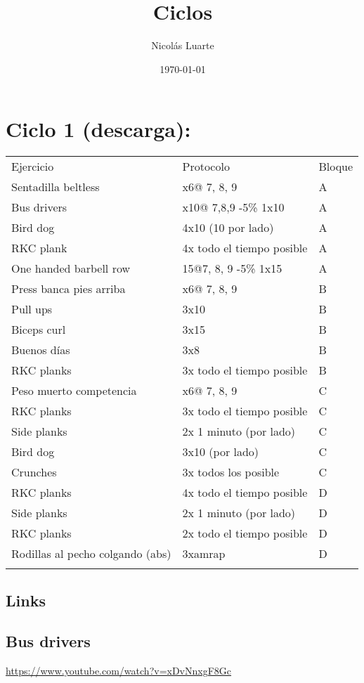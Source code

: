 \documentclass[11pt]{article}
\author{Nicolás Luarte}
\date{\today}
\title{Ciclos}
\begin{document}
\maketitle
\tableofcontents

\section{Ciclo 1 (descarga):}
\label{sec:orgdcea2d1}
\begin{center}
\begin{tabular}{lll}
Ejercicio & Protocolo & Bloque\\
Sentadilla beltless & x6@ 7, 8, 9 & A\\
Bus drivers & x10@ 7,8,9 -5\% 1x10 & A\\
Bird dog & 4x10 (10 por lado) & A\\
RKC plank & 4x todo el tiempo posible & A\\
One handed barbell row & 15@7, 8, 9 -5\% 1x15 & A\\
\hline
Press banca pies arriba & x6@ 7, 8, 9 & B\\
Pull ups & 3x10 & B\\
Biceps curl & 3x15 & B\\
Buenos días & 3x8 & B\\
RKC planks & 3x todo el tiempo posible & B\\
\hline
Peso muerto competencia & x6@ 7, 8, 9 & C\\
RKC planks & 3x todo el tiempo posible & C\\
Side planks & 2x 1 minuto (por lado) & C\\
Bird dog & 3x10 (por lado) & C\\
Crunches & 3x todos los posible & C\\
\hline
RKC planks & 4x todo el tiempo posible & D\\
Side planks & 2x 1 minuto (por lado) & D\\
RKC planks & 2x todo el tiempo posible & D\\
Rodillas al pecho colgando (abs) & 3xamrap & D\\
 &  & \\
\end{tabular}
\end{center}

\subsection{Links}
\label{sec:org11d6dea}
\subsection{Bus drivers}
\label{sec:orge61bc01}
\url{https://www.youtube.com/watch?v=xDvNnxgF8Gc}
\end{document}
